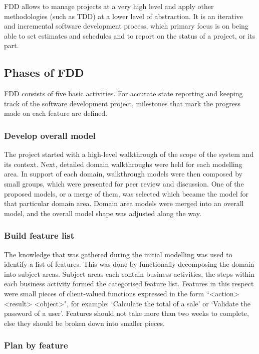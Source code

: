 FDD allows to manage projects at a very high level and apply other methodologies (such as TDD) at a lower level of abstraction. It is an iterative and incremental software development process, which primary focus is on being able to set estimates and schedules and to report on the status of a project, or its part. 

\subsection{Phases of FDD}

FDD consists of five basic activities. For accurate state reporting and keeping track of the software development project, milestones that mark the progress made on each feature are defined.

\subsubsection{Develop overall model}
The project started with a high-level walkthrough of the scope of the system and its context. Next, detailed domain walkthroughs were held for each modelling area. In support of each domain, walkthrough models were then composed by small groups, which were presented for peer review and discussion. One of the proposed models, or a merge of them, was selected which became the model for that particular domain area. Domain area models were merged into an overall model, and the overall model shape was adjusted along the way.

\subsubsection{Build feature list}

The knowledge that was gathered during the initial modelling was used to identify a list of features. This was done by functionally decomposing the domain into subject areas. Subject areas each contain business activities, the steps within each business activity formed the categorised feature list. Features in this respect were small pieces of client-valued functions expressed in the form ``<action> <result> <object>", for example: `Calculate the total of a sale' or `Validate the password of a user'. Features should not take more than two weeks to complete, else they should be broken down into smaller pieces.

\subsubsection{Plan by feature}

